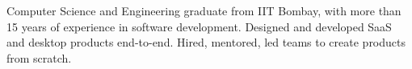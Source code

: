 

\begin{cvparagraph}

Computer Science and Engineering graduate from IIT Bombay, with more than 15 years of experience in software development. Designed and developed SaaS and desktop products end-to-end. Hired, mentored, led teams to create products from scratch.
\end{cvparagraph}

